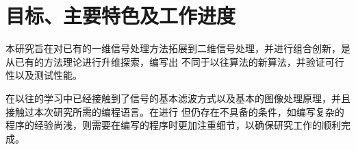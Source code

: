 %
%
%
%

\section{目标、主要特色及工作进度}

本研究旨在对已有的一维信号处理方法拓展到二维信号处理，并进行组合创新，是从已有的方法理论进行升维探索，编写出
不同于以往算法的新算法，并验证可行性以及测试性能。

在以往的学习中已经接触到了信号的基本滤波方式以及基本的图像处理原理，并且接触过本次研究所需的编程语言。在进行
但仍存在不具备的条件，如编写复杂的程序的经验尚浅，则需要在编写的程序时更加注重细节，以确保研究工作的顺利完成。
